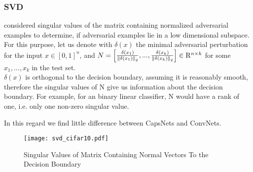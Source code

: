\subsubsection{SVD}

\citet{universal} considered singular values of the matrix containing normalized adversarial examples to determine, if adversarial examples lie in a low dimensional subspace. \\
For this purpose, let us denote with $\delta(x)$ the minimal adversarial perturbation for the input $x \in [0,1]^n$,
and $ N = \begin{bmatrix}
\frac{\delta(x_1)} {\left \lVert \delta(x_1) \right \rVert _2},  ...,  \frac{\delta(x_k)} {\left \lVert \delta(x_k) \right \rVert _2} 
\end{bmatrix}
\in \mathrm{R}^{n \times k}
$ for some $x_1, ..., x_k$ in the test set. \\
$\delta(x)$ is orthogonal to the decision boundary, assuming it is reasonably smooth, therefore the singular values of N give us information about the decision boundary. For example, for an binary linear classifier, N would have a rank of one, i.e. only one non-zero singular value.

In this regard we find little difference between CapsNets and ConvNets.

\begin{figure}
	\caption{Singular Values of Matrix Containing Normal Vectors To the Decision Boundary}
	\texttt{[image: svd\_cifar10.pdf]}
	\label{fig:svd}
\end{figure}
